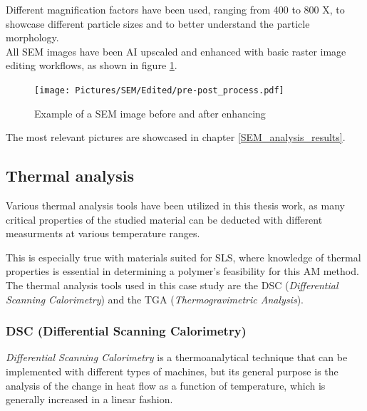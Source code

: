 \documentclass{article}
\begin{document}
            Different magnification factors have been used, ranging from 400 to 800 X, to showcase different particle sizes and to better understand 
            the particle morphology. \\

            All SEM images have been AI upscaled and enhanced with basic raster image editing workflows, as shown in figure \ref{fig:SEM_edited_vs_unedited}. \\ 

                \begin{figure}[h!]
                    \centering
                    \texttt{[image: Pictures/SEM/Edited/pre-post\_process.pdf]}
                    \caption{Example of a SEM image before and after enhancing \autocites{Inkscape}{Pixelmator_Pro}}
                    \label{fig:SEM_edited_vs_unedited}
                \end{figure}

            The most relevant pictures are showcased in chapter \ref{SEM_analysis_results}. \\

            \clearpage

            \subsection{Thermal analysis\label{Thermal_analysis}}
    
            Various thermal analysis tools have been utilized in this thesis work, as many critical properties of the studied material 
            can be deducted with different measurments at various temperature ranges. 

            This is especially true with materials suited for SLS, where knowledge of thermal properties is 
            essential in determining a polymer's feasibility for this AM method. 
            The thermal analysis tools used in this case study are the DSC (\textit{Differential Scanning Calorimetry}) and the TGA
            (\textit{Thermogravimetric Analysis}). \\

            \subsubsection{DSC (Differential Scanning Calorimetry)\label{DSC_analysis}}
        
            \textit{Differential Scanning Calorimetry} is a thermoanalytical technique that can be implemented with different types of machines, 
            but its general purpose is the analysis of the change in heat flow as a function of temperature, which is generally increased in 
            a linear fashion. 
        
\end{document}
